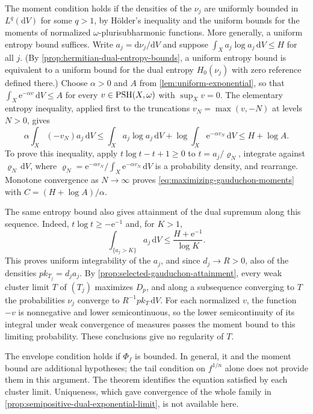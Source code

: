 The moment condition holds if the densities of the $\nu_j$ are uniformly bounded in $L^q(\mathrm{d}V)$ for some $q>1$, by H\"older's inequality and the uniform bounds for the moments of normalized $\omega$-plurisubharmonic functions. More generally, a uniform entropy bound suffices. Write $a_j=\mathrm{d}\nu_j/\mathrm{d}V$ and suppose $\int_Xa_j\log a_j\,\mathrm{d}V\leq H$ for all $j$. (By \cref{prop:hermitian-dual-entropy-bounds}, a uniform entropy bound is equivalent to a uniform bound for the dual entropy $H_0(\nu_j)$ with zero reference defined there.) Choose $\alpha>0$ and $A$ from \cref{lem:uniform-exponential}, so that $\int_X\mathrm{e}^{-\alpha v}\,\mathrm{d}V\leq A$ for every $v\in\mathrm{PSH}(X,\omega)$ with $\sup_Xv=0$. The elementary entropy inequality, applied first to the truncations $v_N=\max(v,-N)$ at levels $N>0$, gives
\[
 \alpha\int_X(-v_N)a_j\,\mathrm{d}V
 \leq \int_Xa_j\log a_j\,\mathrm{d}V
             +\log\int_X\mathrm{e}^{-\alpha v_N}\,\mathrm{d}V
 \leq H+\log A.
\]
To prove this inequality, apply $t\log t-t+1\geq0$ to $t=a_j/\varrho_N$, integrate against $\varrho_N\,\mathrm{d}V$, where $\varrho_N=\mathrm{e}^{-\alpha v_N}/\int_X\mathrm{e}^{-\alpha v_N}\,\mathrm{d}V$ is a probability density, and rearrange. Monotone convergence as $N\to\infty$ proves \eqref{eq:maximizing-gauduchon-moments} with $C=(H+\log A)/\alpha$.

The same entropy bound also gives attainment of the dual supremum along this sequence. Indeed, $t\log t\geq-\mathrm{e}^{-1}$ and, for $K>1$,
\[
 \int_{\{a_j>K\}}a_j\,\mathrm{d}V
       \leq\frac{H+\mathrm{e}^{-1}}{\log K}.
\]
This proves uniform integrability of the $a_j$, and since $d_j\to R>0$, also of the densities $p k_{T_j}=d_ja_j$. By \cref{prop:selected-gauduchon-attainment}, every weak cluster limit $T$ of $(T_j)$ maximizes $D_p$, and along a subsequence converging to $T$ the probabilities $\nu_j$ converge to $R^{-1}p k_T\,\mathrm{d}V$. For each normalized $v$, the function $-v$ is nonnegative and lower semicontinuous, so the lower semicontinuity of its integral under weak convergence of measures passes the moment bound to this limiting probability. These conclusions give no regularity of $T$.

The envelope condition holds if $\Phi_f$ is bounded. In general, it and the moment bound are additional hypotheses; the tail condition on $f^{1/n}$ alone does not provide them in this argument. The theorem identifies the equation satisfied by each cluster limit. Uniqueness, which gave convergence of the whole family in \cref{prop:semipositive-dual-exponential-limit}, is not available here.
